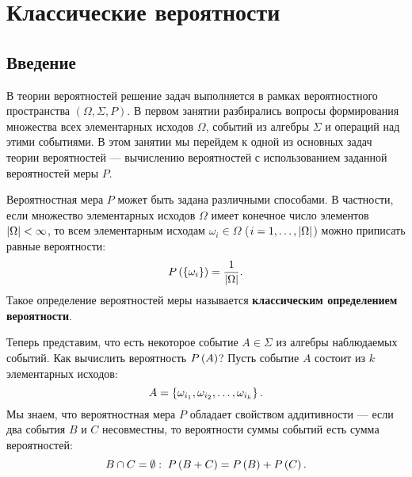 \chapter{Классические вероятности}

\section*{Введение}

В теории вероятностей решение задач выполняется в рамках вероятностного пространства $\left ( \Omega, \Sigma, P \right )$. В первом занятии разбирались вопросы формирования
множества всех элементарных исходов $\Omega$, событий из алгебры $\Sigma$ и операций над этими событиями. В этом занятии мы перейдем к одной из основных задач теории вероятностей
--- вычислению вероятностей с использованием заданной вероятностей меры $P$.

Вероятностная мера $P$ может быть задана различными способами. В частности, если множество элементарных исходов $\Omega$ имеет конечное число элементов $\left | \Omega \right | < \infty$,
то всем элементарным исходам $\omega_i \in \Omega$ ($i=1,\dots,\left | \Omega \right |$) можно приписать равные вероятности:
\begin{equation}
    P \left ( \left \{ \omega_i \right \} \right ) = \frac{1}{\left | \Omega \right |}.
\end{equation}
Такое определение вероятностей меры называется \textbf{классическим определением вероятности}.

Теперь представим, что есть некоторое событие $A \in \Sigma$ из алгебры наблюдаемых событий. Как вычислить вероятность $P \left ( A \right )$? Пусть событие $A$ состоит из $k$
элементарных исходов:
\begin{equation}
    A = \left \{  \omega_{i_1}, \omega_{i_2}, \dots, \omega_{i_k} \right \}.
\end{equation}
Мы знаем, что вероятностная мера $P$ обладает свойством аддитивности --- если два события $B$ и $C$ несовместны, то вероятности суммы событий есть сумма вероятностей:
\begin{equation}
    B \cap C = \emptyset : \; P \left ( B + C \right ) = P \left ( B \right ) + P \left ( C \right ).
\end{equation}

